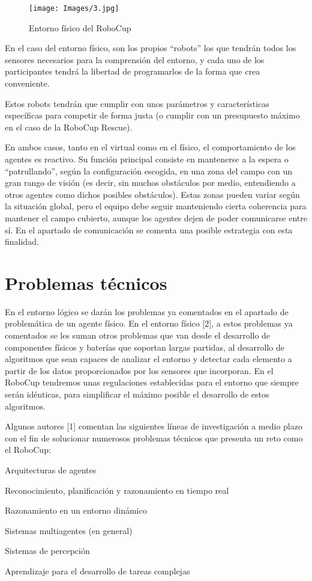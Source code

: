 \documentclass[11pt,oneside,a4paper]{book}
\begin{document}
\begin{figure}[H]
\begin{center}
\texttt{[image: Images/3.jpg]}
\caption{Entorno físico del RoboCup}
\end{center}
\end{figure}
En el caso del entorno físico, son los propios “robots” los que tendrán todos los sensores necesarios para la comprensión del entorno, y cada uno de los participantes tendrá la libertad de programarlos de la forma que crea conveniente.

Estos robots tendrán que cumplir con unos parámetros y características específicas para competir de forma justa (o cumplir con un presupuesto máximo en el caso de la RoboCup Rescue).

En ambos casos, tanto en el virtual como en el físico, el comportamiento de los agentes es reactivo. Su función principal consiste en mantenerse a la espera o “patrullando”, según la configuración escogida, en una zona del campo con un gran rango de visión (es decir, sin muchos obstáculos por medio, entendiendo a otros agentes como dichos posibles obstáculos). Estas zonas pueden variar según la situación global, pero el equipo debe seguir manteniendo cierta coherencia para mantener el campo cubierto, aunque los agentes dejen de poder comunicarse entre sí. En el apartado de comunicación se comenta una posible estrategia con esta finalidad.
\section{Problemas técnicos}
En el entorno lógico se darán los problemas ya comentados en el apartado de problemática de un agente físico. En el entorno físico [2], a estos problemas ya comentados se les suman otros problemas que van desde el desarrollo de componentes físicos y baterías que soportan largas partidas, al desarrollo de algoritmos que sean capaces de analizar el entorno y detectar cada elemento a partir de los datos proporcionados por los sensores que incorporan. En el RoboCup tendremos unas regulaciones establecidas para el entorno que siempre serán idénticas, para simplificar el máximo posible el desarrollo de estos algoritmos.

Algunos autores [1] comentan las siguientes líneas de investigación a medio plazo con el fin de solucionar numerosos problemas técnicos que presenta un reto como el RoboCup:
\begin{list}{•}{}
\item Arquitecturas de agentes
\item Reconocimiento, planificación y razonamiento en tiempo real
\item Razonamiento en un entorno dinámico
\item Sistemas multiagentes (en general)
\item Sistemas de percepción
\item Aprendizaje para el desarrollo de tareas complejas
\end{list}
\end{document}

